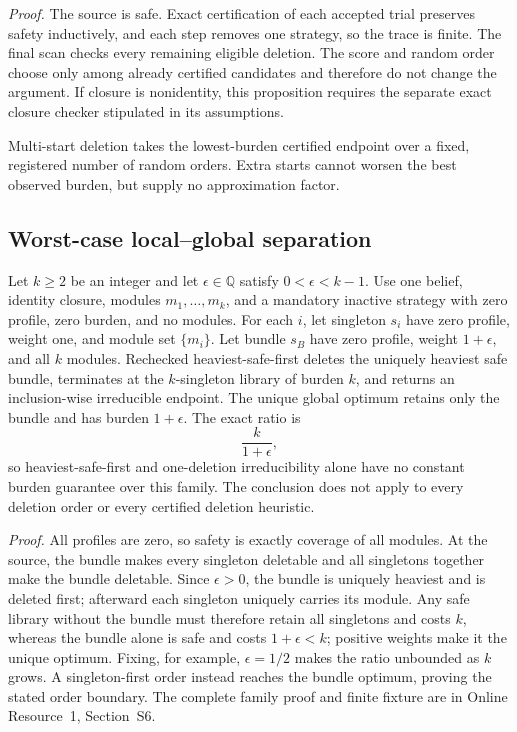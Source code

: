 \noindent\emph{Proof.}
The source is safe.  Exact certification of each accepted trial preserves
safety inductively, and each step removes one strategy, so the trace is finite.
The final scan checks every remaining eligible deletion.  The score and random
order choose only among already certified candidates and therefore do not
change the argument.  If closure is nonidentity, this proposition requires the
separate exact closure checker stipulated in its assumptions.

Multi-start deletion takes the lowest-burden certified endpoint over a fixed,
registered number of random orders. Extra starts cannot worsen the best
observed burden, but supply no approximation factor.

\subsection{Worst-case local--global separation}
\label{sec:aor-safe-deletion-gap}

\begin{theorem}
\label{thm:aor-heaviest-safe-first-gap}
Let \(k\geq2\) be an integer and let
\(\epsilon\in\mathbb Q\) satisfy \(0<\epsilon<k-1\).  Use one belief,
identity closure, modules \(m_1,\ldots,m_k\), and a mandatory inactive
strategy with zero profile, zero burden, and no modules.  For each \(i\), let
singleton \(s_i\) have zero profile, weight one, and module set \(\{m_i\}\).
Let bundle \(s_B\) have zero profile, weight \(1+\epsilon\), and all \(k\)
modules.  Rechecked heaviest-safe-first deletes the uniquely heaviest safe
bundle, terminates at the \(k\)-singleton library of burden \(k\), and returns
an inclusion-wise irreducible endpoint.  The unique global optimum retains
only the bundle and has burden \(1+\epsilon\).  The exact ratio is
\[
  \frac{k}{1+\epsilon},
\]
so heaviest-safe-first and one-deletion irreducibility alone have no constant
burden guarantee over this family.  The conclusion does not apply to every
deletion order or every certified deletion heuristic.
\end{theorem}

\noindent\emph{Proof.}
All profiles are zero, so safety is exactly coverage of all modules.  At the
source, the bundle makes every singleton deletable and all singletons together
make the bundle deletable.  Since \(\epsilon>0\), the bundle is uniquely
heaviest and is deleted first; afterward each singleton uniquely carries its
module.  Any safe library without the bundle must therefore retain all
singletons and costs \(k\), whereas the bundle alone is safe and costs
\(1+\epsilon<k\); positive weights make it the unique optimum.  Fixing, for
example, \(\epsilon=1/2\) makes the ratio unbounded as \(k\) grows.  A
singleton-first order instead reaches the bundle optimum, proving the stated
order boundary.  The complete family proof and finite fixture are in Online Resource~1, Section~S6.

